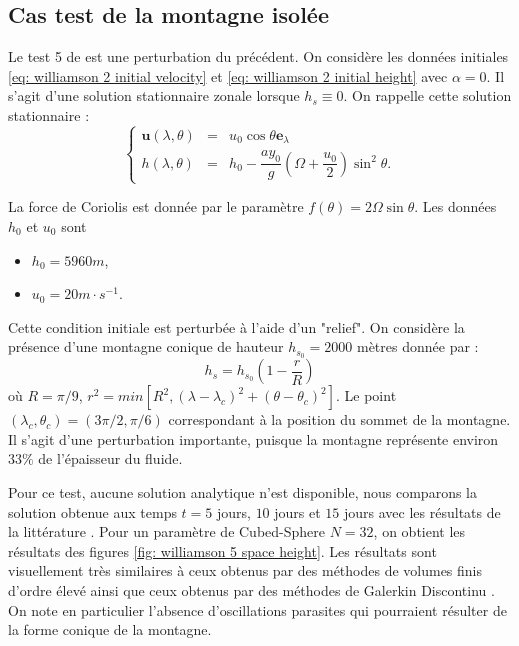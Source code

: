 \subsection{Cas test de la montagne isolée}

Le test 5 de \cite{Williamson1992} est une perturbation du précédent.
On considère les données initiales \eqref{eq: williamson 2 initial velocity} et \eqref{eq: williamson 2 initial height} avec $\alpha = 0$. Il s'agit d'une solution stationnaire zonale lorsque $h_s \equiv 0$. On rappelle cette solution stationnaire :
\begin{equation}
\left\lbrace
\begin{array}{rcl}
\mathbf{u}(\lambda, \theta) & = & u_0 \cos \theta \mathbf{e}_{\lambda} \\
h(\lambda, \theta) & = & h_0 - \dfrac{a y_0}{g} \left( \Omega  + \dfrac{u_0}{2} \right) \sin^2 \theta .
\end{array}
\right.
\end{equation}

La force de Coriolis est donnée par le paramètre $f(\theta) = 2 \Omega \sin \theta$. Les données $h_0$ et $u_0$ sont
\begin{itemize}
\item $h_0 = 5960 \si{m}$,
\item $u_0 = 20 \si{m} \cdot \si{s^{-1}}$.
\end{itemize}
Cette condition initiale est perturbée à l'aide d'un "relief".
On considère la présence d'une montagne conique de hauteur $h_{s_0} = 2000$ mètres donnée par :
\begin{equation}
h_s = h_{s_0} \left( 1 - \dfrac{r}{R} \right)
\end{equation}
où $R= \pi / 9$, $r^2 = min \left[ R^2, \left( \lambda - \lambda_c \right)^2 + \left( \theta - \theta_c \right)^2 \right]$. Le point $(\lambda_c, \theta_c)= (3 \pi / 2, \pi / 6)$ correspondant à la position du sommet de la montagne.
Il s'agit d'une perturbation importante, puisque la montagne représente environ $33 \%$ de l'épaisseur du fluide.

Pour ce test, aucune solution analytique n'est disponible, nous comparons la solution obtenue aux temps $t=5$ jours, $10$ jours et $15$ jours avec les résultats de la littérature \cite{Ullrich2011, Kuang2016}. Pour un paramètre de Cubed-Sphere $N=32$, on obtient les résultats des figures \ref{fig: williamson 5 space height}. Les résultats sont visuellement très similaires à ceux obtenus par des méthodes de volumes finis \cite{Katta2015, Chen2008} d'ordre élevé ainsi que ceux obtenus par des méthodes de Galerkin Discontinu \cite{Nair2005}. On note en particulier l'absence d'oscillations parasites qui pourraient résulter de la forme conique de la montagne.

